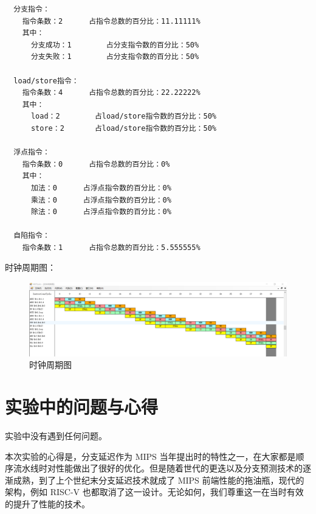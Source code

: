 \documentclass[blue,normal,cn]{elegantnote}
\begin{document}
\begin{enumerate}[wide=0pt, listparindent=2em, parsep=0pt]
\begin{itemize}[leftmargin=3em, listparindent=2em, parsep=0pt]
\begin{lstlisting}
  分支指令：
    指令条数：2		占指令总数的百分比：11.11111%
    其中：
      分支成功：1		占分支指令数的百分比：50%
      分支失败：1		占分支指令数的百分比：50%

  load/store指令：
    指令条数：4		占指令总数的百分比：22.22222%
    其中：
      load：2		占load/store指令数的百分比：50%
      store：2		占load/store指令数的百分比：50%

  浮点指令：
    指令条数：0		占指令总数的百分比：0%
    其中：
      加法：0		占浮点指令数的百分比：0%
      乘法：0		占浮点指令数的百分比：0%
      除法：0		占浮点指令数的百分比：0%

  自陷指令：
    指令条数：1		占指令总数的百分比：5.555555%
\end{lstlisting}

                    \textcolor{ans}{时钟周期图：}
                    \begin{figure}[H]
                        \centering
                        \includegraphics[width=.8\textwidth]{fig/delayed-branch.png}
                        \caption{时钟周期图}
                    \end{figure}


          \end{itemize}

\end{enumerate}

\section{实验中的问题与心得}

实验中没有遇到任何问题。

本次实验的心得是，分支延迟作为 MIPS 当年提出时的特性之一，在大家都是顺序流水线时对性能做出了很好的优化。但是随着世代的更迭以及分支预测技术的逐渐成熟，到了上个世纪末分支延迟技术就成了 MIPS 前端性能的拖油瓶，现代的架构，例如 RISC-V 也都取消了这一设计。无论如何，我们尊重这一在当时有效的提升了性能的技术。
\end{document}
